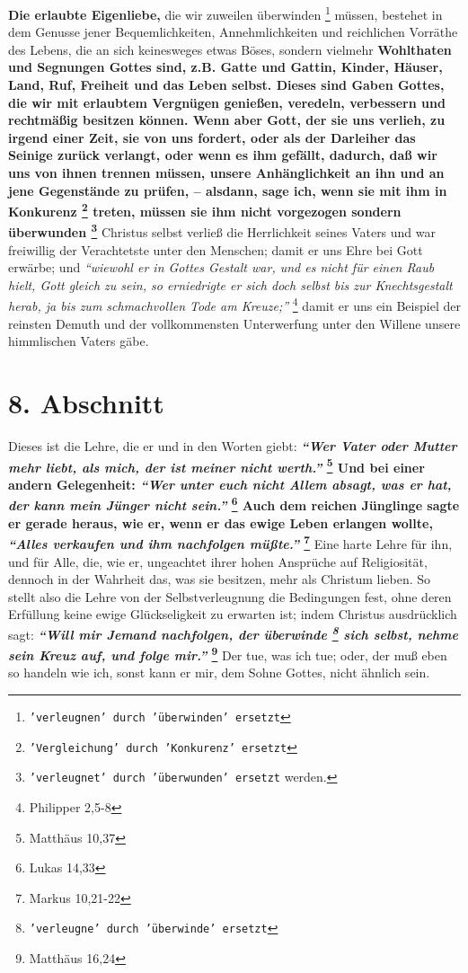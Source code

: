 \textbf{Die erlaubte Eigenliebe,} die wir zuweilen überwinden
\footnote{\texttt{'verleugnen' durch 'überwinden' ersetzt}} müssen, bestehet in dem
Genusse jener Bequemlichkeiten, Annehmlichkeiten und reichlichen Vorräthe des
Lebens, die an sich keinesweges etwas Böses, sondern vielmehr \textbf{Wohlthaten
und
Segnungen Gottes sind, z.B. Gatte und Gattin, Kinder, Häuser, Land, Ruf,
Freiheit und das Leben selbst. Dieses sind Gaben Gottes, die wir mit erlaubtem
Vergnügen genießen, veredeln, verbessern und rechtmäßig besitzen können. Wenn
aber Gott, der sie uns verlieh, zu irgend einer Zeit, sie von uns fordert, oder
als der Darleiher das Seinige zurück verlangt, oder wenn es ihm gefällt,
dadurch, daß wir uns von ihnen trennen müssen, unsere Anhänglichkeit an ihn und
an jene Gegenstände zu prüfen, -- alsdann, sage ich, wenn sie mit ihm in
Konkurenz
\footnote{\texttt{'Vergleichung' durch 'Konkurenz' ersetzt}} treten, müssen
sie ihm nicht vorgezogen sondern überwunden \footnote{\texttt{'verleugnet' durch
'überwunden' ersetzt} werden.}}
Christus selbst verließ die Herrlichkeit seines Vaters und war freiwillig der
Verachtetste unter den Menschen; damit er uns Ehre bei Gott erwärbe; und
\textit{"`wiewohl er in Gottes Gestalt war, und es nicht für einen Raub hielt,
Gott
gleich zu sein, so erniedrigte er sich doch selbst bis zur Knechtsgestalt
herab, ja bis zum schmachvollen Tode am Kreuze;"'}
\footnote{Philipper 2,5-8}
damit er
uns ein Beispiel der reinsten Demuth und der vollkommensten Unterwerfung unter
den Willene unsere himmlischen Vaters gäbe.

\section{8. Abschnitt} \label{kap4_ab8}

Dieses ist die Lehre, die er und in den Worten giebt:
\textbf{
\textit{"`Wer Vater oder Mutter mehr liebt, als mich, der ist meiner nicht
werth."'}
\footnote{Matthäus  10,37}
Und bei einer andern Gelegenheit:
\textit{"`Wer unter euch nicht Allem absagt, was er hat, der kann mein Jünger
nicht sein."'}
\footnote{Lukas 14,33} Auch dem reichen
Jünglinge sagte er gerade heraus, wie er, wenn er das ewige Leben erlangen
wollte,
\textit{"`Alles verkaufen und ihm nachfolgen müßte."'}
\footnote{Markus 10,21-22}
}
Eine harte Lehre für ihn, und für Alle, die, wie er, ungeachtet ihrer hohen
Ansprüche auf Religiosität, dennoch in der Wahrheit das, was sie besitzen, mehr
als Christum lieben. So stellt also die Lehre von der Selbstverleugnung die
Bedingungen fest, ohne deren Erfüllung keine ewige Glückseligkeit zu erwarten
ist; indem Christus ausdrücklich sagt:
\textbf{
\textit{"`Will mir Jemand nachfolgen, der überwinde \footnote{\texttt{'verleugne'
durch 'überwinde' ersetzt}} sich selbst, nehme sein Kreuz auf, und folge
mir."'}
\footnote{Matthäus 16,24}}
Der tue, was ich tue; oder, der muß eben so handeln wie ich, sonst kann
er mir, dem Sohne Gottes, nicht ähnlich sein.

